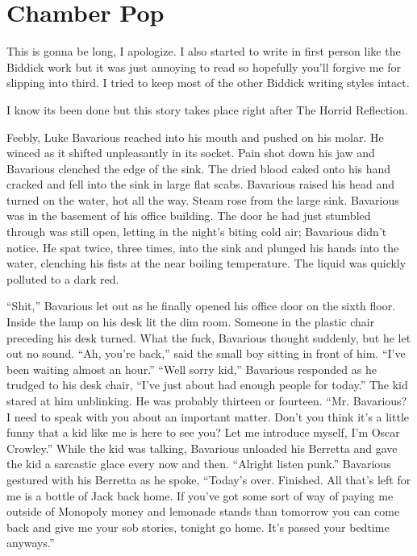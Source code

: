  



\chapter{ Chamber Pop}

This is gonna be long, I apologize. I also started to write in
first person like the Biddick work but it was just annoying to read
so hopefully you'll forgive me for slipping into third. I tried to
keep most of the other Biddick writing styles intact.



I know its been done but this story takes place right after The
Horrid Reflection.





Feebly, Luke Bavarious reached into his mouth and pushed on his
molar. He winced as it shifted unpleasantly in its socket. Pain
shot down his jaw and Bavarious clenched the edge of the sink. The
dried blood caked onto his hand cracked and fell into the sink in
large flat scabs. Bavarious raised his head and turned on the
water, hot all the way. Steam rose from the large sink. Bavarious
was in the basement of his office building. The door he had just
stumbled through was still open, letting in the night's
biting cold air; Bavarious didn't notice. He spat twice,
three times, into the sink and plunged his hands into the water,
clenching his fists at the near boiling temperature. The liquid was
quickly polluted to a dark red.



``Shit,'' Bavarious let out as he finally opened his
office door on the sixth floor. Inside the lamp on his desk lit the
dim room. Someone in the plastic chair preceding his desk turned.
What the fuck, Bavarious thought suddenly, but he let out no sound.
``Ah, you're back,'' said the small boy sitting in
front of him. ``I've been waiting almost an hour.''
``Well sorry kid,'' Bavarious responded as he trudged to
his desk chair, ``I've just about had enough people for
today.'' The kid stared at him unblinking. He was probably
thirteen or fourteen. ``Mr. Bavarious? I need to speak with
you about an important matter. Don't you think it's a
little funny that a kid like me is here to see you? Let me
introduce myself, I'm Oscar Crowley.'' While the kid was
talking, Bavarious unloaded his Berretta and gave the kid a
sarcastic glace every now and then. ``Alright listen
punk.'' Bavarious gestured with his Berretta as he spoke,
``Today's over. Finished. All that's left for me
is a bottle of Jack back home. If you've got some sort of way
of paying me outside of Monopoly money and lemonade stands than
tomorrow you can come back and give me your sob stories, tonight go
home. It's passed your bedtime anyways.''



